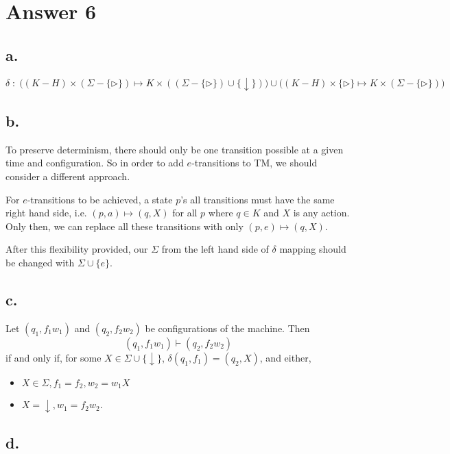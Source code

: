 \documentclass[12pt]{article}
\begin{document}
\section*{Answer 6}

  \subsection*{a.}
    $$\delta\;:\;\big((K-H) \times (\Sigma-\{\triangleright\}) \mapsto K\times((\Sigma-\{\triangleright\}) \cup \{\downarrow\})\big) \cup \big((K-H) \times \{\triangleright\} \mapsto K\times(\Sigma-\{\triangleright\})\big)$$

  \subsection*{b.}
    \qquad To preserve determinism, there should only be one transition possible at a given time and configuration. So in order to add $e$-transitions to TM, we should consider a different approach.

    \qquad For $e$-transitions to be achieved, a state $p$'s all transitions must have the same right hand side, i.e. $(p, a) \mapsto (q, X)$ for all $p$ where $q\in K$ and $X$ is any action. Only then, we can replace all these transitions with only $(p, e) \mapsto (q, X)$.

    \qquad After this flexibility provided, our $\Sigma$ from the left hand side of $\delta$ mapping should be changed with $\Sigma \cup \{e\}$.

  \subsection*{c.}
    Let $(q_1, f_1w_1)$ and $(q_2, f_2w_2)$ be configurations of the machine. Then $$(q_1, f_1w_1) \vdash (q_2, f_2w_2)$$ if and only if, for some $X \in \Sigma\cup\{\downarrow\}$, $\delta(q_1, f_1) = (q_2,  X)$, and either,
    \begin{itemize}
      \item $X \in \Sigma, f_1=f_2, w_2 = w_1X$
      \item $X = \downarrow, w_1 = f_2w_2$.
    \end{itemize}
  
  \newpage

  \subsection*{d.}
\end{document}
